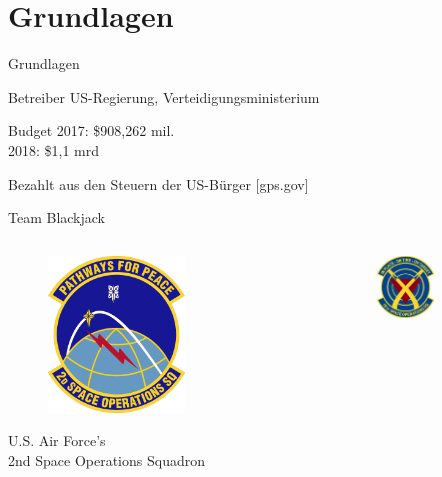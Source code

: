 \section{Grundlagen}
\begin{frame}{Grundlagen}
    \begin{block}{Betreiber}
        US-Regierung, Verteidigungsministerium
    \end{block}
    \begin{block}{Budget}
        2017: \$908,262 mil.\\
        2018: \$1,1 mrd
    \end{block}
    Bezahlt aus den Steuern der US-Bürger {\small [gps.gov]}
\end{frame}

\begin{frame}{Team Blackjack}
    \begin{columns}
        \begin{column}{0.5\textwidth}
            \begin{figure}
                \includegraphics[width=0.6\textwidth]{images/2sops.PNG}
            \end{figure}
            U.S. Air Force's\\
            2nd Space Operations Squadron
        \end{column}
        \begin{column}{0.5\textwidth}
            \begin{figure}
                \includegraphics[width=0.6\textwidth]{images/19sops.JPG}

\end{figure}
\end{column}
\end{columns}
\end{frame}
